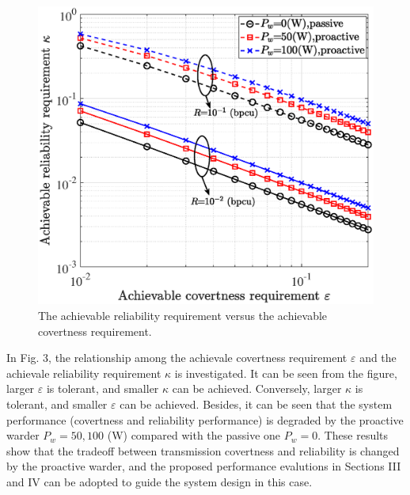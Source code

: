 \documentclass[conference]{IEEEtran}
\begin{document}
\begin{figure}
	\centering
	\includegraphics[width=0.85\linewidth]{figure/fig3_re.eps}
	\caption{The achievable reliability requirement versus the achievable covertness requirement.}
	\label{fig_sim}
\end{figure}

In Fig. 3, the relationship among the achievale covertness requirement $\varepsilon$ and the achievale reliability requirement $\kappa$ is investigated. It can be seen from the figure, larger $\varepsilon$ is tolerant, and smaller $\kappa$ can be achieved. Conversely, larger $\kappa$ is tolerant, and smaller $\varepsilon$ can be achieved. Besides, it can be seen that the system performance (covertness and reliability performance) is degraded by the proactive warder $P_w=50,100$ (W) compared with the passive one $P_w=0$. These results show that the tradeoff between transmission covertness and reliability is changed by the proactive warder, and the proposed performance evalutions in Sections III and IV can be adopted to guide the system design in this case.
\end{document}
